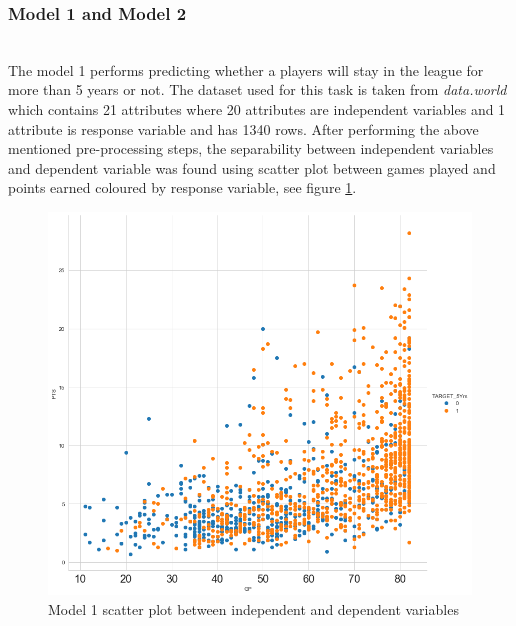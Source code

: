 \documentclass[format=sigconf]{acmart}
\begin{document}
\subsubsection{Model 1 and Model 2}
\hfill\\
The model 1 performs predicting whether a players will stay in the league for more than 5 years or not. The dataset used for this
task is taken from \textit{data.world} which contains 21 attributes where 20 attributes are independent variables and
1 attribute is response variable and has 1340 rows. After performing the above mentioned pre-processing steps, the separability
between independent variables and dependent variable was found using scatter plot between games played and points earned coloured by 
response variable, see figure \ref{fig:model1scatter}.
\begin{figure}[H]
    \centering
    \includegraphics[scale=0.25]{images/model_1_scatter_plot.png}
    \caption{Model 1 scatter plot between independent and dependent variables}
    \label{fig:model1scatter}
\end{figure}
\end{document}
